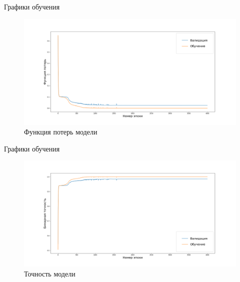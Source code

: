 \documentclass{beamer}
\begin{document}
\begin{frame}{Графики обучения}

\begin{figure}[h]
    \centering
    \includegraphics[scale=0.3]{model_loss}
    \caption{Функция потерь модели}
    \label{fig:loss}
\end{figure}

\end{frame}

\begin{frame}{Графики обучения}
\begin{figure}[h]
    \centering
    \includegraphics[scale=0.3]{model_binary_accuracy}
    \caption{Точность модели}
    \label{fig:accuracy}
\end{figure}

\end{frame}
\end{document}
